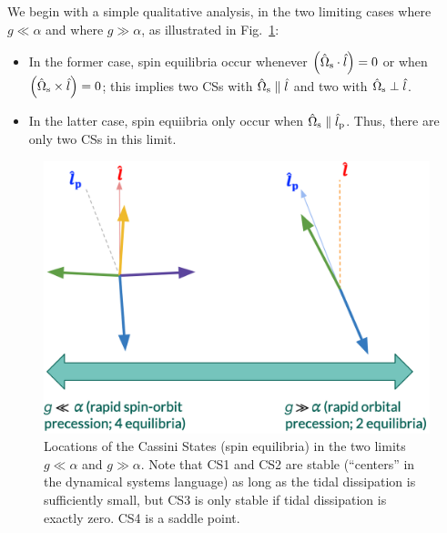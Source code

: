 \documentclass[11pt,
        usenames, %
        dvipsnames %
    ]{article}
\newcommand*{\p}[1]{\left(#1\right)}
\begin{document}
We begin with a simple qualitative analysis, in the two limiting cases where $g
\ll \alpha$ and where $g \gg \alpha$, as illustrated in Fig.~\ref{fig:cs_limits}:
\begin{itemize}
    \item In the former case, spin equilibria occur
          whenever $\p{\hat{\Omega}_{\rm s} \cdot \hat{l}} = 0$ or when
          $\p{\hat{\Omega}_{\rm s} \times \hat{l}} = 0$; this implies two CSs
          with $\hat{\Omega}_{\rm s} \parallel \hat{l}$ and two with
          $\hat{\Omega}_{\rm s} \perp \hat{l}$.

    \item In the latter case, spin equiibria only occur when $\hat{\Omega}_{\rm
        s} \parallel \hat{l}_{\rm p}$. Thus, there are only two CSs in this
        limit.
\end{itemize}
\begin{figure}
    \centering
    \includegraphics[width=0.5\columnwidth]{cs_limits.png}
    \caption{Locations of the Cassini States (spin equilibria) in the two limits
    $g \ll \alpha$ and $g \gg \alpha$. Note that CS1 and CS2 are stable
    (``centers'' in the dynamical systems language) as long
    as the tidal dissipation is sufficiently small, but CS3 is only stable if
    tidal dissipation is exactly zero. CS4 is a saddle
    point.}\label{fig:cs_limits}
\end{figure}
\end{document}
